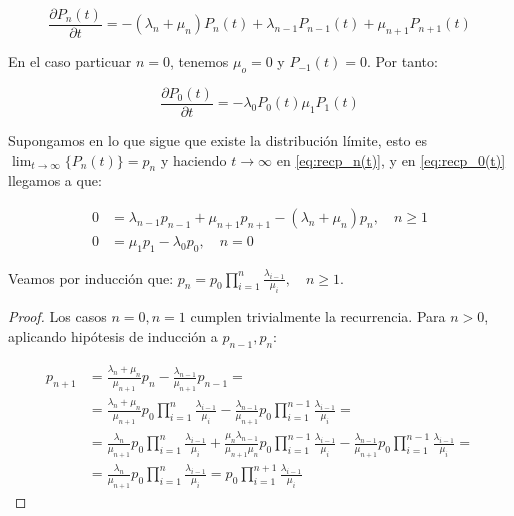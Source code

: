 \documentclass[a4paper,10pt]{scrartcl}
\theoremstyle{definition}
\numberwithin{equation}{section}
\begin{document}
\begin{equation}
\frac{\partial P_n(t)}{\partial t} = -(\lambda_n + \mu_n) P_n(t) + \lambda_{n-1}P_{n-1}(t) + \mu_{n+1}P_{n+1}(t)
\label{eq:recp_n(t)}
\end{equation}

En el caso particuar $n=0$, tenemos $\mu_o = 0$ y $P_{-1}(t) = 0$. Por tanto:

\begin{equation}
 \frac{\partial P_0(t)}{\partial t} = -\lambda_0 P_0(t) \mu_{1}P_{1}(t)
 \label{eq:recp_0(t)}
\end{equation}


Supongamos en lo que sigue que existe la distribución límite, esto es 
$\lim_{t\rightarrow \infty}\{P_n(t)\} = p_n$ y haciendo $t\rightarrow \infty$ en \eqref{eq:recp_n(t)},
y en \eqref{eq:recp_0(t)} llegamos a que:

\begin{align*}
0 &= \lambda_{n-1} p_{n-1} + \mu_{n+1} p_{n+1} - (\lambda_n + \mu_n) p_n, \quad n\ge 1\\
0 &= \mu_1 p_1 -\lambda_0 p_0, \quad n=0
\end{align*}

Veamos por inducción que: $p_n = p_0 \prod_{i=1}^n \frac{\lambda_{i-1}}{\mu_i}, \quad n\ge 1$.

\begin{proof}
 Los casos $n=0, n=1$ cumplen trivialmente la recurrencia. Para $n>0$, aplicando hipótesis de inducción a $p_{n-1}, p_{n}$:
 
 \begin{align*}
 p_{n+1} &= \frac{\lambda_n + \mu_n}{\mu_{n+1}} p_n - \frac{\lambda_{n-1}}{\mu_{n+1}}p_{n-1} = \\
         &= \frac{\lambda_n + \mu_n}{\mu_{n+1}} p_0 \prod_{i=1}^n \frac{\lambda_{i-1}}{\mu_i} - 
            \frac{\lambda_{n-1}}{\mu_{n+1}} p_0 \prod_{i=1}^{n-1} \frac{\lambda_{i-1}}{\mu_i} = \\
         &= \frac{\lambda_n}{\mu_{n+1}} p_0 \prod_{i=1}^n \frac{\lambda_{i-1}}{\mu_i} + 
            \frac{\mu_n \lambda_{n-1}}{\mu_{n+1}\mu_n} p_0 \prod_{i=1}^{n-1} \frac{\lambda_{i-1}}{\mu_i} - 
            \frac{\lambda_{n-1}}{\mu_{n+1}} p_0 \prod_{i=1}^{n-1} \frac{\lambda_{i-1}}{\mu_i} = \\
         &= \frac{\lambda_n}{\mu_{n+1}} p_0 \prod_{i=1}^n \frac{\lambda_{i-1}}{\mu_i} = p_0 \prod_{i=1}^{n+1} \frac{\lambda_{i-1}}{\mu_i}
 \end{align*}
\end{proof}
\end{document}
